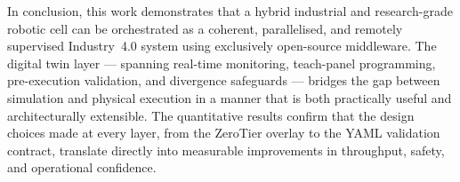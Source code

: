 \vspace{1em}

In conclusion, this work demonstrates that a hybrid industrial and research-grade robotic cell
can be orchestrated as a coherent, parallelised, and remotely supervised Industry~4.0 system
using exclusively open-source middleware.  The digital twin layer — spanning real-time
monitoring, teach-panel programming, pre-execution validation, and divergence safeguards —
bridges the gap between simulation and physical execution in a manner that is both practically
useful and architecturally extensible.  The quantitative results confirm that the design choices
made at every layer, from the ZeroTier overlay to the YAML validation contract, translate
directly into measurable improvements in throughput, safety, and operational confidence.
